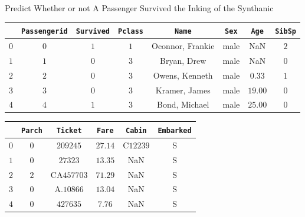 \documentclass[
size=14pt,
paper=smartboard,  %
mode=present, 		%
display=slides, 	%
style=tuliplab,  	%
pauseslide,
fleqn,leqno]{powerdot}
\begin{document}
	
	\begin{slide}[toc=,bm=]{Predict Whether or not A Passenger Survived the Inking of the Synthanic}
		\begin{center}
			\begin{tabular}{c| c c c c c c c}
				\toprule
				{} & \texttt{Passengerid}  & \texttt{Survived} & \texttt{Pclass} & \texttt{Name}  & \texttt{Sex} & \texttt{Age}  & \texttt{SibSp} \\
				\midrule
				$0$
				&  {$0$} &  {$1$} &  {$1$} &  {Oconnor, Frankie} &  {male} &  {NaN} &  {$2$} \\
				$1$
				&  {$1$} &  {$0$}&  {$3$}&  {Bryan, Drew} &  {male} &  {NaN} &  {$0$} \\
				$2$
				&  {$2$} &  {$0$} &  {$3$} &  {Owens, Kenneth} &  {male} &  {$0.33$} &  {$1$} \\
				$3$
				&  {$3$} &  {$0$}&  {$3$}&  {Kramer, James} &  {male} &  {$19.00$} &  {$0$} \\
				$4$
				&  {$4$} &  {$1$} &  {$3$} &  {Bond, Michael} &  {male} &  {$25.00$} &  {$0$} \\
				\bottomrule
			\end{tabular}
		\end{center}
		\begin{center}
			\begin{tabular}{c| c c c c c}
				\toprule
				{} & \texttt{Parch} & \texttt{Ticket}  & \texttt{Fare} & \texttt{Cabin}  & \texttt{Embarked}\\
				\midrule
				$0$
				&  {$0$} &  {$209245$} &  {$27.14$} &  {C$12239$} &  {S} \\
				$1$
				&  {$0$} &  {$27323$} &  {$13.35$} &  {NaN} &  {S} \\
				$2$
				&  {$2$} &  {CA$457703$} &  {$71.29$} &  {NaN} &  {S} \\
				$3$
				&  {$0$} &  {A$.10866$} &  {$13.04$} &  {NaN} &  {S} \\
				$4$
				&  {$0$} &  {$427635$} &  {$7.76$} &  {NaN} &  {S} \\
				\bottomrule
			\end{tabular}
		\end{center}
	\end{slide}
	
	
	
\end{document}
